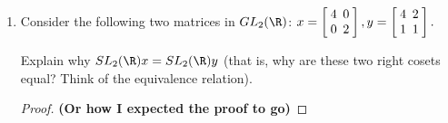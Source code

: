 \documentclass[letterpaper]{article}
\begin{document}
\begin{enumerate}
\begin{enumerate}
\begin{proof}
\[\begin{array}{rcl}
	\left[\begin{array}{lr}
	a_2 & b_2 \\
	0 & c_2 \\
	\end{array} \right]
	\\
	&=&
	\arraycolsep=3.4pt\def\arraystretch{1}
	\left[\begin{array}{cc}
	a_1a_2 & (a_1b_2+b_1c_2) \\
	0 & c_1c_2 \\
	\end{array} \right]\\
	\end{array} \]
	and, since we know that $a_1,a_2,c_1,c_2\neq0$, then $a_1a_2,c_1c_2\neq0$ as well. Thus, $h_1h_2\in H$, and $H$ is closed. 
	\end{proof}		
	
	\item Consider the following two matrices in $GL_2(\R)$: 
	$x=
	\arraycolsep=2.4pt\def\arraystretch{1}
	\left[\begin{array}{lr}
	4 & 0 \\
	0 & 2 \\
	\end{array} \right],
	y=
	\arraycolsep=2.4pt\def\arraystretch{1}
	\left[\begin{array}{lr}
	4 & 2 \\
	1 & 1 \\
	\end{array} \right].$
	
	Explain why $SL_2(\R)x=SL_2(\R)y$ (that is, why are these two right cosets
equal? Think of the equivalence relation).
	
	\begin{proof}
	\textbf{(Or how I expected the proof to go)} 
	

\end{proof}
\end{enumerate}
\end{enumerate}
\end{document}
